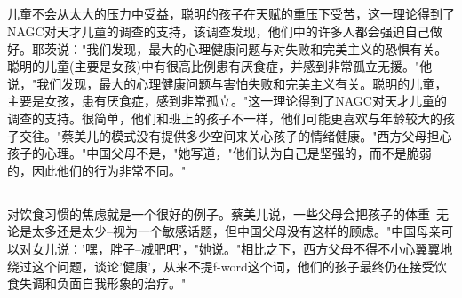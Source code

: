\documentclass[]{article}
\begin{document}
\begin{spacing}{1.75}
{	\subsection{}
	儿童不会从太大的压力中受益，聪明的孩子在天赋的重压下受苦，这一理论得到了NAGC对天才儿童的调查的支持，该调查发现，他们中的许多人都会强迫自己做好。耶茨说："我们发现，最大的心理健康问题与对失败和完美主义的恐惧有关。聪明的儿童(主要是女孩)中有很高比例患有厌食症，并感到非常孤立无援。"他说，"我们发现，最大的心理健康问题与害怕失败和完美主义有关。聪明的儿童，主要是女孩，患有厌食症，感到非常孤立。"这一理论得到了NAGC对天才儿童的调查的支持。很简单，他们和班上的孩子不一样，他们可能更喜欢与年龄较大的孩子交往。"蔡美儿的模式没有提供多少空间来关心孩子的情绪健康。"西方父母担心孩子的心理。"中国父母不是，"她写道，"他们认为自己是坚强的，而不是脆弱的，因此他们的行为非常不同。"
	\subsection{}
	对饮食习惯的焦虑就是一个很好的例子。蔡美儿说，一些父母会把孩子的体重--无论是太多还是太少--视为一个敏感话题，但中国父母没有这样的顾虑。"中国母亲可以对女儿说：'嘿，胖子--减肥吧'，"她说。"相比之下，西方父母不得不小心翼翼地绕过这个问题，谈论'健康'，从来不提f-word这个词，他们的孩子最终仍在接受饮食失调和负面自我形象的治疗。"
	
}
\end{spacing}
\end{document}
